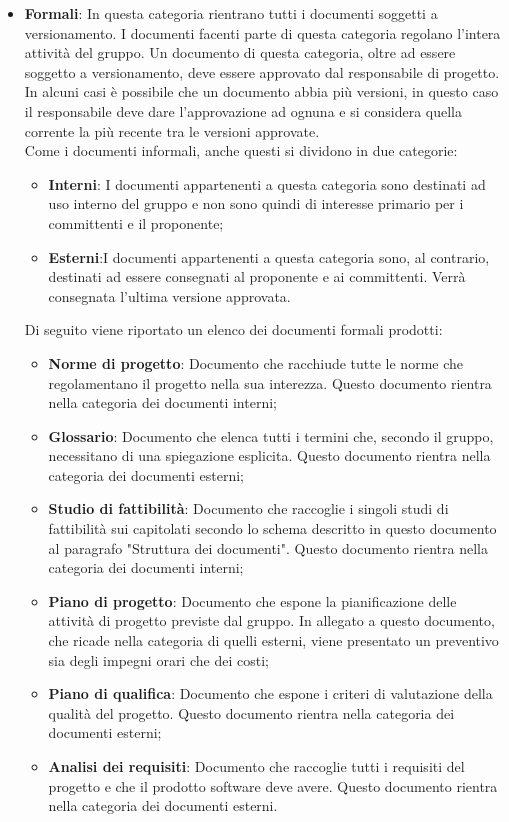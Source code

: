 \documentclass[../norme-di-progetto.tex]{subfiles}
\begin{document}
\begin{itemize}
    \item \textbf{Formali}: In questa categoria rientrano tutti i documenti soggetti a versionamento. I documenti facenti parte di questa categoria regolano l'intera attività del gruppo. Un documento di questa categoria, oltre ad essere soggetto a versionamento, deve essere approvato dal responsabile di progetto. In alcuni casi è possibile che un documento abbia più versioni, in questo caso il responsabile deve dare l'approvazione ad ognuna e si considera quella corrente la più recente tra le versioni approvate.\\
    Come i documenti informali, anche questi si dividono in due categorie:
    \begin{itemize}
        \item \textbf{Interni}: I documenti appartenenti a questa categoria sono destinati ad uso interno del gruppo e non sono quindi di interesse primario per i committenti e il proponente;
        \item \textbf{Esterni}:I documenti appartenenti a questa categoria sono, al contrario, destinati ad essere consegnati al proponente e ai committenti. Verrà consegnata l'ultima versione approvata.
    \end{itemize}
    Di seguito viene riportato un elenco dei documenti formali prodotti:
    \begin{itemize}
        \item \textbf{Norme di progetto}: Documento che racchiude tutte le norme che regolamentano il progetto nella sua interezza. Questo documento rientra nella categoria dei documenti interni;
        \item \textbf{Glossario}: Documento che elenca tutti i termini che, secondo il gruppo, necessitano di una spiegazione esplicita. Questo documento rientra nella categoria dei documenti esterni;
        \item \textbf{Studio di fattibilità}: Documento che raccoglie i singoli studi di fattibilità sui capitolati secondo lo schema descritto in questo documento al paragrafo "Struttura dei documenti". Questo documento rientra nella categoria dei documenti interni;
        \item \textbf{Piano di progetto}: Documento che espone la pianificazione delle attività di progetto previste dal gruppo. In allegato a questo documento, che ricade nella categoria di quelli esterni, viene presentato un preventivo sia degli impegni orari che dei costi;
        \item \textbf{Piano di qualifica}: Documento che espone i criteri di valutazione della qualità del progetto. Questo documento rientra nella categoria dei documenti esterni;
        \item \textbf{Analisi dei requisiti}: Documento che raccoglie tutti i requisiti del progetto e che il prodotto software deve avere. Questo documento rientra nella categoria dei documenti esterni.
  \end{itemize}
  
\end{itemize}
\end{document}
